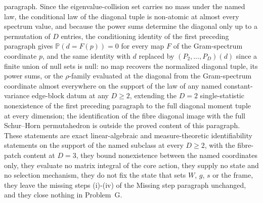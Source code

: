 paragraph. Since the eigenvalue-collision set carries no mass under the named law, the conditional law of the diagonal tuple is non-atomic at almost every spectrum value, and because the power sums determine the diagonal only up to a permutation of \(D\) entries, the conditioning identity of the first preceding paragraph gives \(\mathbb{P}(d=F(p))=0\) for every map \(F\) of the Gram-spectrum coordinate \(p\), and the same identity with \(d\) replaced by \((P_{2},\dots,P_{D})(d)\) since a finite union of null sets is null: no map recovers the normalized diagonal tuple, its power sums, or the \(\rho\)-family evaluated at the diagonal from the Gram-spectrum coordinate almost everywhere on the support of the law of any named constant-variance edge-block datum at any \(D\ge2\), extending the \(D=2\) single-statistic nonexistence of the first preceding paragraph to the full diagonal moment tuple at every dimension; the identification of the fibre diagonal image with the full Schur--Horn permutahedron is outside the proved content of this paragraph. These statements are exact linear-algebraic and measure-theoretic identifiability statements on the support of the named subclass at every \(D\ge2\), with the fibre-patch content at \(D=3\), they bound nonexistence between the named coordinates only, they evaluate no matrix integral of the core action, they supply no state and no selection mechanism, they do not fix the state that sets \(W\), \(g\), \(s\) or the frame, they leave the missing steps (i)-(iv) of the Missing step paragraph unchanged, and they close nothing in Problem~G.

